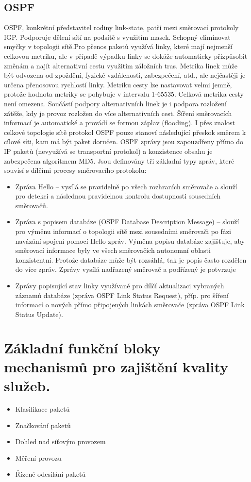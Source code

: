\subsection{OSPF}
OSPF, konkrétní představitel rodiny link-state, patří mezi směrovací protokoly IGP. Podporuje dělení sítí na podsítě s využitím masek. Schopný eliminovat smyčky v topologii sítě.Pro přenos paketů využívá linky, které mají nejmenší celkovou metriku, ale v případě výpadku linky se dokáže automaticky přizpůsobit změnám a najít alternativní cestu využitím záložních tras. Metrika linek může být odvozena od zpoždění, fyzické vzdálenosti, zabezpečení, atd., ale
nejčastěji je určena přenosovou rychlostí linky. Metriku cesty lze nastavovat velmi jemně,
protože hodnota metriky se pohybuje v intervalu 1-65535. Celková metrika cesty není
omezena. Součástí podpory alternativních linek je i podpora rozložení zátěže, kdy je provoz
rozložen do více alternativních cest. Šíření směrovacích informací je automatické a provádí se
formou záplav (flooding). I přes znalost celkové topologie sítě protokol OSPF pouze stanoví
následující přeskok směrem k cílové síti, kam má být paket doručen.
OSPF zprávy jsou zapouzdřeny přímo do IP paketů (nevyužívá se transportní protokol)
a konzistence obsahu je zabezpečena algoritmem MD5. Jsou definovány tři základní typy
zpráv, které souvisí s dílčími procesy směrovacího protokolu:
\begin{itemize}
\item Zpráva Hello – vysílá se pravidelně po všech rozhraních směrovače a slouží pro
detekci a následnou pravidelnou kontrolu dostupnosti sousedních směrovačů.
\item Zpráva s popisem databáze (OSPF Database Description Message) – slouží pro
výměnu informací o topologii sítě mezi sousedními směrovači po fázi navázání
spojení pomocí Hello zpráv. Výměna popisu databáze zajišťuje, aby směrovací
informace byly ve všech směrovačích autonomní oblasti konzistentní. Protože
databáze může být rozsáhlá, tak je popis často rozdělen do více zpráv. Zprávy vysílá
nadřazený směrovač a podřízený je potvrzuje
\item Zprávy popisující stav linky využívané pro dílčí aktualizaci vybraných záznamů
databáze (zpráva OSPF Link Status Request), příp. pro šíření informací o nových
přímo připojených linkách směrovače (zpráva OSPF Link Status Update).
\end{itemize}
\newpage





\section{Základní funkční bloky mechanismů pro zajištění kvality služeb.}
\begin{itemize}
\item Klasifikace paketů
\item Značkování paketů
\item Dohled nad síťovým provozem
\item Měření provozu
\item Řízené odesílání paketů
\end{itemize}
